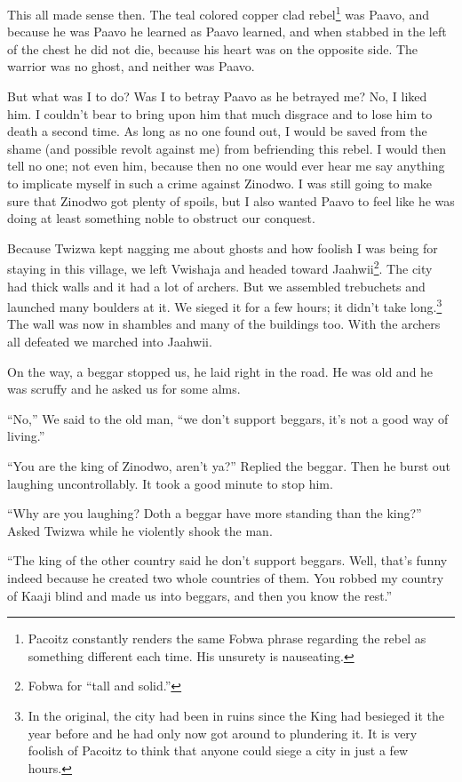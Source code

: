 This all made sense then. The teal colored copper clad rebel\footnote{Pacoitz constantly renders the same Fo\-bwa phrase regarding the rebel as something different each time. His unsurety is nauseating.} was Paavo, and because he was Paavo he learned as Paavo learned, and when stabbed in the left of the chest he did not die, because his heart was on the opposite side. The warrior was no ghost, and neither was Paavo.

But what was I to do? Was I to betray Paavo as he betrayed me?
No, I liked him.
I couldn't bear to bring upon him that much disgrace and to lose him to death a second time.
As long as no one found out, I would be saved from the shame (and possible revolt against me) from befriending this rebel. I would then tell no one; not even him, because then no one would ever hear me say anything to implicate myself in such a crime against Zinodwo. I was still going to make sure that Zinodwo got plenty of spoils, but I also wanted Paavo to feel like he was doing at least something noble to obstruct our conquest.

\tbreak

Because Twizwa kept nagging me about ghosts and how foolish I was being for staying in this village, we left Vwishaja and headed toward Jaa\-hwii\footnote{Fo\-bwa for ``tall and solid.''}. The city had thick walls and it had a lot of archers. But we assembled trebuchets and launched many boulders at it. We sieged it for a few hours; it didn't take long.\footnote{In the original, the city had been in ruins since the King had besieged it the year before and he had only now got around to plundering it. It is very foolish of Pacoitz to think that anyone could siege a city in just a few hours.} The wall was now in shambles and many of the buildings too. With the archers all defeated we marched into Jaa\-hwii.

On the way, a beggar stopped us, he laid right in the road. He was old and he was scruffy and he asked us for some alms.

``No,'' We said to the old man, ``we don't support beggars, it's not a good way of living.''

``You are the king of Zinodwo, aren't ya?'' Replied the beggar. Then he burst out laughing uncontrollably. It took a good minute to stop him.

``Why are you laughing? Doth a beggar have more standing than the king?'' Asked Twizwa while he violently shook the man.

``The king of the other country said he don't support beggars. Well, that's funny indeed because he created two whole countries of them. You robbed my country of Kaaji blind and made us into beggars, and then you know the rest.''


